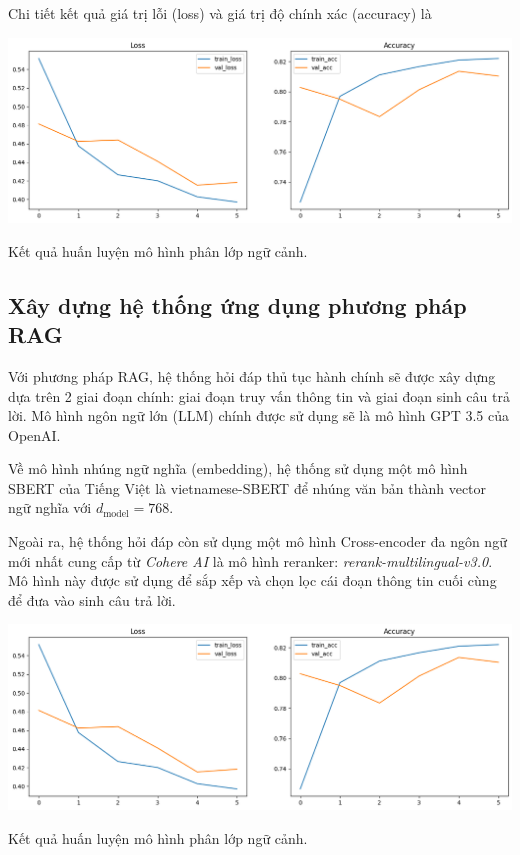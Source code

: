 \documentclass[a4paper, 12pt, openany]{book}
\begin{document}
Chi tiết kết quả giá trị lỗi (loss) và giá trị độ chính xác (accuracy) là

\begin{minipage}{\linewidth}
    \centering
    \includegraphics[width=\linewidth]{./assets/images/training-result.png}
    \captionsetup{type=figure}
    \caption{Kết quả huấn luyện mô hình phân lớp ngữ cảnh.}
\end{minipage}
\vspace{0.5cm}

\subsection{Xây dựng hệ thống ứng dụng phương pháp RAG}

Với phương pháp RAG, hệ thống hỏi đáp thủ tục hành chính sẽ được xây dựng dựa trên 2 giai đoạn chính: giai đoạn truy vấn thông tin và giai đoạn sinh câu trả lời.
Mô hình ngôn ngữ lớn (LLM) chính được sử dụng sẽ là mô hình GPT 3.5 của OpenAI.

Về mô hình nhúng ngữ nghĩa (embedding), hệ thống sử dụng một mô hình SBERT của Tiếng Việt là vietnamese-SBERT để nhúng văn bản thành vector ngữ nghĩa với
\(d_{\text{model}} = 768\).

Ngoài ra, hệ thống hỏi đáp còn sử dụng một mô hình Cross-encoder đa ngôn ngữ mới nhất cung cấp từ \textit{Cohere AI} là mô hình reranker: 
\textit{rerank-multilingual-v3.0}. Mô hình này được sử dụng để sắp xếp và chọn lọc cái đoạn thông tin cuối cùng để đưa vào sinh câu trả lời.

\vspace{0.5cm}
\begin{minipage}{\linewidth}
    \centering
    \includegraphics[width=\linewidth]{./assets/images/training-result.png}
    \captionsetup{type=figure}
    \caption{Kết quả huấn luyện mô hình phân lớp ngữ cảnh.}
\end{minipage}
\vspace{0.5cm}
\end{document}
